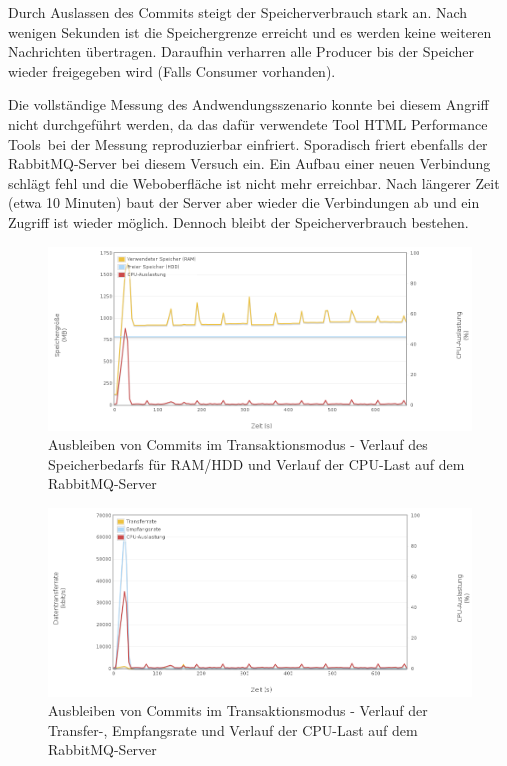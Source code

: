 \documentclass[	a4paper,
			11pt,
			oneside,
			parskip]{scrartcl}
\begin{document}
	
	\clearpage
		{
		  \newline
		  \newline
		  \newline
		}{
		 Durch Auslassen des Commits steigt der Speicherverbrauch stark an. Nach wenigen Sekunden ist die Speichergrenze erreicht und es werden keine weiteren Nachrichten übertragen. Daraufhin verharren alle Producer bis der Speicher wieder freigegeben wird (Falls Consumer vorhanden).
		}{
		 Die vollständige Messung des Andwendungsszenario konnte bei diesem Angriff nicht durchgeführt werden, da das dafür verwendete Tool \glqq HTML Performance Tools\grqq\ bei der Messung reproduzierbar einfriert. Sporadisch friert ebenfalls der RabbitMQ-Server bei diesem Versuch ein. Ein Aufbau einer neuen Verbindung schlägt fehl und die Weboberfläche ist nicht mehr erreichbar. Nach längerer Zeit (etwa 10 Minuten) baut der Server aber wieder die Verbindungen ab und ein Zugriff ist wieder möglich. Dennoch bleibt der Speicherverbrauch bestehen.

		}

		\begin{figure}[!htb]
			\centering
			\includegraphics[width=\textwidth]{img/tx/tx_server1.png}
			\caption{Ausbleiben von Commits im Transaktionsmodus - Verlauf des Speicherbedarfs für RAM/HDD und Verlauf der CPU-Last auf dem RabbitMQ-Server}
			\label{fig:tx-server1}
		\end{figure}
		
		\begin{figure}[!htb]
			\centering
			\includegraphics[width=\textwidth]{img/tx/tx_server2.png}
			\caption{Ausbleiben von Commits im Transaktionsmodus - Verlauf der Transfer-, Empfangsrate und Verlauf der CPU-Last auf dem RabbitMQ-Server}
			\label{fig:tx-server2}
		\end{figure}
		
\end{document}
